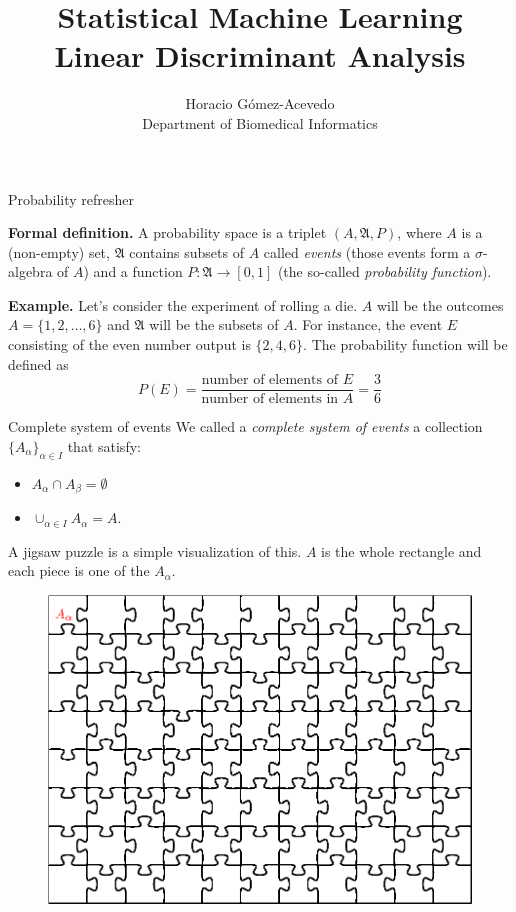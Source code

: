 \documentclass{beamer}
\title{Statistical Machine Learning\\ Linear Discriminant Analysis}
\author{Horacio G\'omez-Acevedo\\ Department of Biomedical Informatics}
\begin{document}
	\begin{frame}[plain]
		\maketitle
	\end{frame}
\begin{frame}{Probability refresher}
	
	{\bf Formal definition. } A probability space is a triplet $(A, \mathfrak{A},P )$, where $A$ is a (non-empty) set, $\mathfrak{A}$ contains subsets of $A$ called {\it events} (those events form a $\sigma$-algebra of $A$) and a function $P\colon \mathfrak{A}\to [0,1]$ (the so-called {\it probability function}).
	
	{\bf Example.}
	Let's consider the experiment of rolling a die. $A$ will be the outcomes $A=\{ 1,2, \ldots, 6\}$ and $\mathfrak{A}$ will be the subsets of $A$. For instance, the event $E$ consisting of the even number output is $\{2,4,6\}$. The probability function will be defined as 
	\begin{equation*}
		P(E) = \frac{ \textrm{number of elements of }E}{\textrm{number of elements in }A}= \frac{3}{6}
	\end{equation*}
	
\end{frame}

\begin{frame}{Complete system of events}
	We called a {\it complete system of events} a collection  $\{ A_\alpha \}_{\alpha \in I}$ that satisfy:
	\begin{itemize}
		\item $A_\alpha \cap A_\beta = \emptyset$
		\item $\cup_{\alpha \in I} A_\alpha= A$.
	\end{itemize}
 A jigsaw puzzle is a simple visualization of this. $A$ is the whole rectangle and each piece is one of the $A_\alpha$. 
 \begin{figure}[h]
 	\centering
 	\includegraphics[scale=0.35]{../../Figures/fig_jigsaw.png}
 \end{figure}
\end{frame}
\end{document}
